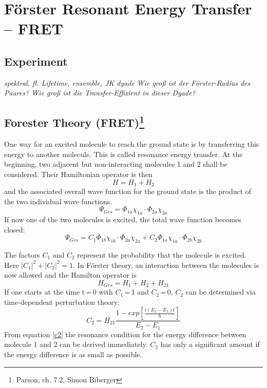 

\chapter{Förster Resonant Energy Transfer -- FRET}



\section{Experiment}

\textit{spektral, fl. Lifetime, ensemble, JK dyade
}
\textit{Wie groß ist der Förster-Radius des Paares? Wie groß ist die Transfer-Effizient in dieser Dyade?
}


\section{Forester Theory (FRET)\protect\footnote{Parson, ch. 7.2, Simon Biberger}} 


One way for an excited molecule to reach the ground state is by transferring this energy to another molecule. This is called resonance energy transfer.
At the beginning, two adjacent but non-interacting molecules 1 and 2 shall be considered. Their Hamiltonian operator is then
\begin{equation*}
    H = H_1 + H_2
\end{equation*}
and the associated overall wave function for the ground state is the product of the two individual wave functions.
\begin{equation*}
    \Psi_{Ges} = \Phi_{1a} \chi_{1a}\cdot \Phi_{2a} \chi_{2a}
\end{equation*}
If now one of the two molecules is excited, the total wave function becomes closed:
\begin{equation*}
    \Psi_{Ges} = C_1 \Phi_{1b} \chi_{1b}\cdot \Phi_{2a} \chi_{2a} + C_2 \Phi_{1a} \chi_{1a}\cdot \Phi_{2b} \chi_{2b}
\end{equation*}

The factors $C_1$ and $C_2$ represent the probability that the molecule is excited. Here $|C_1|^2 + |C_2|^2 = 1$.
In Förster theory, an interaction between the molecules is now allowed and the Hamilton operator is
\begin{equation*}
    H_{Ges} = H_1 + H_2 + H_{21}
\end{equation*}
If one starts at the time t\,=\,0 with $C_1$\,=\,1 and $C_2$\,=\,0, $C_2$ can be determined via time-dependent perturbation theory:
\begin{equation}
    C_2 = H_{21} \frac{1 - exp \left[\frac{i(E_2 - E_1)t}{\hbar} \right] } {E_2 - E_1}
    \label{c2}
\end{equation}
From equation \ref{c2} the resonance condition for the energy difference between molecule 1 and 2 can be derived immediately. $C_2$ has only a significant amount if the energy difference is as small as possible.


